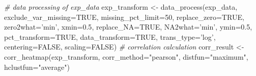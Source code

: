 \documentclass[]{article}
\newcommand{\hlnum}[1]{\textcolor[rgb]{0.816,0.125,0.439}{#1}}%
\newcommand{\hlstr}[1]{\textcolor[rgb]{0.251,0.627,0.251}{#1}}%
\newcommand{\hlcom}[1]{\textcolor[rgb]{0.502,0.502,0.502}{\textit{#1}}}%
\newcommand{\hlstd}[1]{\textcolor[rgb]{0.251,0.251,0.251}{#1}}%
\newcommand{\hlkwc}[1]{\textcolor[rgb]{0.251,0.251,0.251}{#1}}%
\newcommand{\hlkwd}[1]{\textcolor[rgb]{0.878,0.439,0.125}{#1}}%
\newenvironment{Shaded}{\begin{myshaded}}{\end{myshaded}}
\newcommand{\KeywordTok}[1]{\hlkwd{#1}}
\newcommand{\DataTypeTok}[1]{\hlkwc{#1}}
\newcommand{\DecValTok}[1]{\hlnum{#1}}
\newcommand{\FloatTok}[1]{\hlnum{#1}}
\newcommand{\StringTok}[1]{\hlstr{#1}}
\newcommand{\CommentTok}[1]{\hlcom{#1}}
\newcommand{\OtherTok}[1]{{#1}}
\newcommand{\NormalTok}[1]{\hlstd{#1}}
\begin{document}
\begin{Shaded}
\begin{Highlighting}[]
\CommentTok{# data processing of exp_data}
\NormalTok{exp_transform <-}\StringTok{ }\KeywordTok{data_process}\NormalTok{(exp_data, }\DataTypeTok{exclude_var_missing=}\OtherTok{TRUE}\NormalTok{,}
                              \DataTypeTok{missing_pct_limit=}\DecValTok{50}\NormalTok{, }\DataTypeTok{replace_zero=}\OtherTok{TRUE}\NormalTok{,}
                              \DataTypeTok{zero2what=}\StringTok{'min'}\NormalTok{, }\DataTypeTok{xmin=}\FloatTok{0.5}\NormalTok{, }\DataTypeTok{replace_NA=}\OtherTok{TRUE}\NormalTok{,}
                              \DataTypeTok{NA2what=}\StringTok{'min'}\NormalTok{, }\DataTypeTok{ymin=}\FloatTok{0.5}\NormalTok{, }\DataTypeTok{pct_transform=}\OtherTok{TRUE}\NormalTok{,}
                              \DataTypeTok{data_transform=}\OtherTok{TRUE}\NormalTok{, }\DataTypeTok{trans_type=}\StringTok{'log'}\NormalTok{,}
                              \DataTypeTok{centering=}\OtherTok{FALSE}\NormalTok{, }\DataTypeTok{scaling=}\OtherTok{FALSE}\NormalTok{)}
\CommentTok{# correlation calculation}
\NormalTok{corr_result <-}\StringTok{ }\KeywordTok{corr_heatmap}\NormalTok{(exp_transform, }\DataTypeTok{corr_method=}\StringTok{"pearson"}\NormalTok{,}
                            \DataTypeTok{distfun=}\StringTok{"maximum"}\NormalTok{, }\DataTypeTok{hclustfun=}\StringTok{"average"}\NormalTok{)}


\end{Highlighting}
\end{Shaded}
\end{document}
